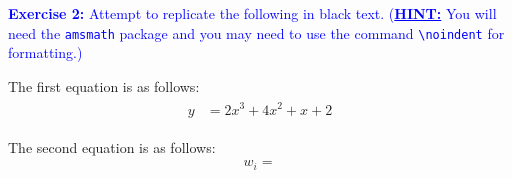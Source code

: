 \documentclass[]{article}
\newcommand{\Jeff}[1]{\textcolor{blue}{#1}}
\begin{document}
\noindent \Jeff{\textbf{Exercise 2:} Attempt to replicate the following in black text.
(\textbf{\underline{HINT:}} You will need the \texttt{amsmath} package and you may need to use the command \texttt{\textbackslash noindent} for formatting.)}
\vspace{1cm}

\noindent The first equation is as follows:
\begin{align}
\begin{split}
	y &= 2x^3 + 4x^2 + x + 2
\end{split}
\end{align}


\noindent The second equation is as follows:
\begin{align}
	w_i = 
\end{align}
\end{document}
